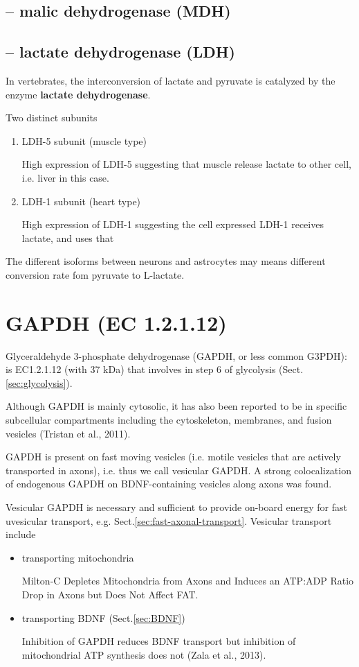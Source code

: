 \subsection{-- malic dehydrogenase (MDH)}
\label{sec:malic-dehydrogenase}

\subsection{-- lactate dehydrogenase (LDH)}
\label{sec:lactate-dehydrogenase}
\label{sec:LDH}

In vertebrates, the interconversion of lactate and pyruvate is catalyzed by the
enzyme {\bf lactate dehydrogenase}.

Two distinct subunits 
\begin{enumerate}
  \item LDH-5 subunit (muscle type)
  
High expression of LDH-5 suggesting that muscle release lactate to other cell,
i.e. liver in this case. 
  
  \item LDH-1 subunit (heart type)

High expression of LDH-1 suggesting the cell expressed LDH-1 receives lactate,
and uses that
\end{enumerate}

The different isoforms between neurons and astrocytes may means different
conversion rate fom pyruvate to L-lactate. 

\section{GAPDH (EC 1.2.1.12)}
\label{sec:GAPDH-enzyme}


Glyceraldehyde 3-phosphate dehydrogenase (GAPDH, or less common G3PDH):
is EC1.2.1.12 (with 37 kDa) that involves in step 6 of glycolysis
(Sect.\ref{sec:glycolysis}).

Although GAPDH is mainly cytosolic, it has also been reported to
be in specific subcellular compartments including the cytoskeleton,
membranes, and fusion vesicles (Tristan et al., 2011).

GAPDH is present on fast moving vesicles (i.e. motile vesicles that are actively
transported in axons), i.e. thus we call vesicular GAPDH.
A strong colocalization of endogenous GAPDH on BDNF-containing
vesicles along axons was found.

Vesicular GAPDH is necessary and sufficient to provide on-board energy for fast
uvesicular transport, e.g. Sect.\ref{sec:fast-axonal-transport}. Vesicular
transport include
\begin{itemize}
  \item transporting mitochondria
  
Milton-C Depletes Mitochondria from Axons and Induces an ATP:ADP Ratio Drop in
Axons but Does Not Affect FAT.
  
  \item transporting BDNF (Sect.\ref{sec:BDNF})
  
Inhibition of GAPDH reduces BDNF transport but inhibition of mitochondrial ATP
synthesis does not (Zala et al., 2013).

\end{itemize}

